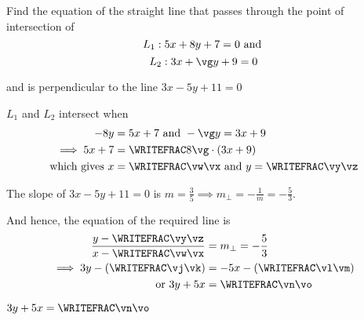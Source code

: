 


%
%

\EXPR[0]{\vg}{\vb / \vf} %
\FRACTIONSIMPLIFY\vb\vg\vp\vq
\EXPR[0]\vw{\vp*\ve-\vq*\vc}
\EXPR[0]\vx{\vq*\va-\vp*\vd}
\FRACMULT{}\vw\vx\vr\vs
\FRACMINUS\vr\vs{}\vt\vu
\FRACDIV\vt\vu{}\vy\vz %

\vy\vz\vj\vk
{}\vw\vx\vl\vm
\FRACMINUS\vj\vk\vl\vm\vn\vo

\question[4] Find the equation of the straight line that passes through the point of intersection of 
\[ L_1: 5 x + 8 y + 7 = 0 \text{ and } \]
\[ L_2: \vd x + \vg y + \ve = 0 \] 

and is perpendicular to the line $3x-5y+11 = 0$

\watchout

\ifprintanswers
\fi 

\begin{solution}[\halfpage]
  $L_1$ and $L_2$ intersect when 
	\begin{align}
      -\vb y &= \va x + \vc \text{ and } -\vg y = \vd x + \ve \\
      \implies \va x + \vc &= \WRITEFRAC\vb\vg\cdot (\vd x + \ve) \\
      \text{which gives } x &= \WRITEFRAC\vw\vx\text{ and } y = \WRITEFRAC\vy\vz
	\end{align}
	
  The slope of $3x-5y+11=0$ is $m=\frac{3}{5}\implies m_\perp = -\frac{1}{m}=-\frac{5}{3}$.

  And hence, the equation of the required line is 
	\begin{align}
		\dfrac{y - \WRITEFRAC\vy\vz}{x - \WRITEFRAC\vw\vx} &= m_\perp = -\dfrac{5}{3} \\
		\implies 3y - \left(\WRITEFRAC\vj\vk\right) &= -5x-\left(\WRITEFRAC\vl\vm\right) \\
		\text{ or } 3y + 5x &= \WRITEFRAC\vn\vo 
	\end{align}
\end{solution}

\ifprintanswers
  \begin{codex}
		$3y + 5x = \WRITEFRAC\vn\vo$
  \end{codex}
\fi

